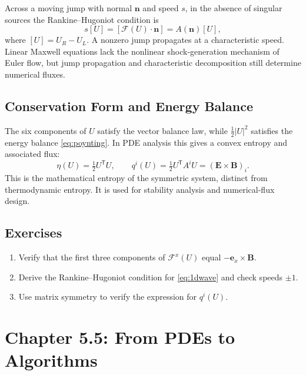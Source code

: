 \documentclass[11pt,openany]{book}
\numberwithin{equation}{chapter}
\theoremstyle{definition}
\theoremstyle{remark}
\begin{document}
Across a moving jump with normal $\bm n$ and speed $s$, in the absence of singular sources the Rankine--Hugoniot condition is
\begin{equation}\label{eq:RH}
s[U]=[\mathcal F(U)\cdot\bm n]=A(\bm n)[U],
\end{equation}
where $[U]=U_R-U_L$. A nonzero jump propagates at a characteristic speed. Linear Maxwell equations lack the nonlinear shock-generation mechanism of Euler flow, but jump propagation and characteristic decomposition still determine numerical fluxes.

\section{Conservation Form and Energy Balance}
The six components of $U$ satisfy the vector balance law, while $\tfrac12|U|^2$ satisfies the energy balance \eqref{eq:poynting}. In PDE analysis this gives a convex entropy and associated flux:
\begin{equation}
\eta(U)=\tfrac12 U^\mathsf TU,\qquad
q^i(U)=\tfrac12 U^\mathsf TA^iU=(\bm E\times\bm B)_i.
\end{equation}
This is the mathematical entropy of the symmetric system, distinct from thermodynamic entropy. It is used for stability analysis and numerical-flux design.

\section{Exercises}
\begin{enumerate}
\item Verify that the first three components of $\mathcal F^x(U)$ equal $-\bm e_x\times\bm B$.
\item Derive the Rankine--Hugoniot condition for \eqref{eq:1dwave} and check speeds $\pm1$.
\item Use matrix symmetry to verify the expression for $q^i(U)$.
\end{enumerate}


\begingroup
\chapter*{Chapter 5.5: From PDEs to Algorithms}
{}
\setcounter{section}{0}
\renewcommand{\thesection}{5.5.\arabic{section}}
\renewcommand{\thesubsection}{5.5.\arabic{section}.\arabic{subsection}}
\renewcommand{\theHsection}{bridge.\arabic{section}}
\setcounter{equation}{0}
\renewcommand{\theequation}{5.5.\arabic{equation}}
\renewcommand{\theHequation}{bridge.\arabic{equation}}
\label{ch:bridge}
\end{document}
